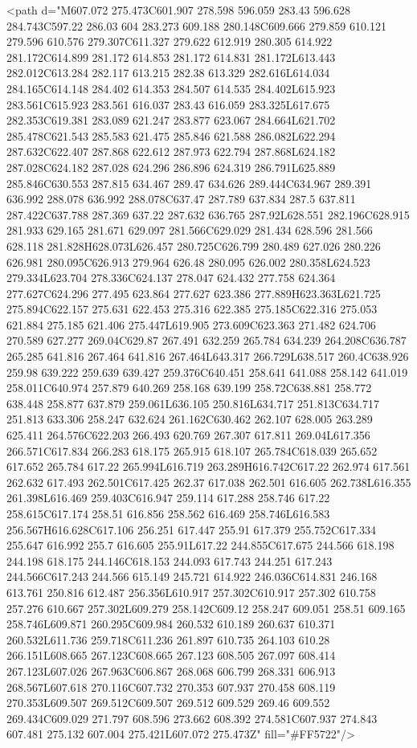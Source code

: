 <path d="M607.072 275.473C601.907 278.598 596.059 283.43 596.628 284.743C597.22 286.03 604 283.273 609.188 280.148C609.666 279.859 610.121 279.596 610.576 279.307C611.327 279.622 612.919 280.305 614.922 281.172C614.899 281.172 614.853 281.172 614.831 281.172L613.443 282.012C613.284 282.117 613.215 282.38 613.329 282.616L614.034 284.165C614.148 284.402 614.353 284.507 614.535 284.402L615.923 283.561C615.923 283.561 616.037 283.43 616.059 283.325L617.675 282.353C619.381 283.089 621.247 283.877 623.067 284.664L621.702 285.478C621.543 285.583 621.475 285.846 621.588 286.082L622.294 287.632C622.407 287.868 622.612 287.973 622.794 287.868L624.182 287.028C624.182 287.028 624.296 286.896 624.319 286.791L625.889 285.846C630.553 287.815 634.467 289.47 634.626 289.444C634.967 289.391 636.992 288.078 636.992 288.078C637.47 287.789 637.834 287.5 637.811 287.422C637.788 287.369 637.22 287.632 636.765 287.92L628.551 282.196C628.915 281.933 629.165 281.671 629.097 281.566C629.029 281.434 628.596 281.566 628.118 281.828H628.073L626.457 280.725C626.799 280.489 627.026 280.226 626.981 280.095C626.913 279.964 626.48 280.095 626.002 280.358L624.523 279.334L623.704 278.336C624.137 278.047 624.432 277.758 624.364 277.627C624.296 277.495 623.864 277.627 623.386 277.889H623.363L621.725 275.894C622.157 275.631 622.453 275.316 622.385 275.185C622.316 275.053 621.884 275.185 621.406 275.447L619.905 273.609C623.363 271.482 624.706 270.589 627.277 269.04C629.87 267.491 632.259 265.784 634.239 264.208C636.787 265.285 641.816 267.464 641.816 267.464L643.317 266.729L638.517 260.4C638.926 259.98 639.222 259.639 639.427 259.376C640.451 258.641 641.088 258.142 641.019 258.011C640.974 257.879 640.269 258.168 639.199 258.72C638.881 258.772 638.448 258.877 637.879 259.061L636.105 250.816L634.717 251.813C634.717 251.813 633.306 258.247 632.624 261.162C630.462 262.107 628.005 263.289 625.411 264.576C622.203 266.493 620.769 267.307 617.811 269.04L617.356 266.571C617.834 266.283 618.175 265.915 618.107 265.784C618.039 265.652 617.652 265.784 617.22 265.994L616.719 263.289H616.742C617.22 262.974 617.561 262.632 617.493 262.501C617.425 262.37 617.038 262.501 616.605 262.738L616.355 261.398L616.469 259.403C616.947 259.114 617.288 258.746 617.22 258.615C617.174 258.51 616.856 258.562 616.469 258.746L616.583 256.567H616.628C617.106 256.251 617.447 255.91 617.379 255.752C617.334 255.647 616.992 255.7 616.605 255.91L617.22 244.855C617.675 244.566 618.198 244.198 618.175 244.146C618.153 244.093 617.743 244.251 617.243 244.566C617.243 244.566 615.149 245.721 614.922 246.036C614.831 246.168 613.761 250.816 612.487 256.356L610.917 257.302C610.917 257.302 610.758 257.276 610.667 257.302L609.279 258.142C609.12 258.247 609.051 258.51 609.165 258.746L609.871 260.295C609.984 260.532 610.189 260.637 610.371 260.532L611.736 259.718C611.236 261.897 610.735 264.103 610.28 266.151L608.665 267.123C608.665 267.123 608.505 267.097 608.414 267.123L607.026 267.963C606.867 268.068 606.799 268.331 606.913 268.567L607.618 270.116C607.732 270.353 607.937 270.458 608.119 270.353L609.507 269.512C609.507 269.512 609.529 269.46 609.552 269.434C609.029 271.797 608.596 273.662 608.392 274.581C607.937 274.843 607.481 275.132 607.004 275.421L607.072 275.473Z" fill="#FF5722"/>
